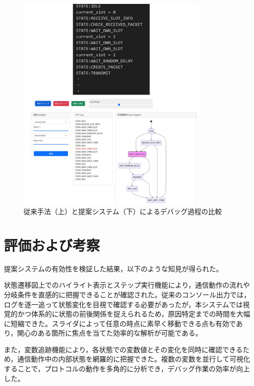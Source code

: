 \documentclass[technicalreport]{ieicej}
\begin{document}
\begin{figure}[h]
  \centering
  \includegraphics[width=95mm]{./images/3_debug_comparison.pdf}
  \caption{従来手法（上）と提案システム（下）によるデバッグ過程の比較}
  \label{fig:debug-comparison}
\end{figure}




\section{評価および考察}
提案システムの有効性を検証した結果，以下のような知見が得られた。

状態遷移図上でのハイライト表示とステップ実行機能により，通信動作の流れや分岐条件を直感的に把握できることが確認された。従来のコンソール出力では，ログを逐一追って状態変化を目視で確認する必要があったが，本システムでは視覚的かつ体系的に状態の前後関係を捉えられるため，原因特定までの時間を大幅に短縮できた。スライダによって任意の時点に素早く移動できる点も有効であり，関心のある箇所に焦点を当てた効率的な解析が可能である。

また，変数追跡機能により，各状態での変数値とその変化を同時に確認できるため，通信動作中の内部状態を網羅的に把握できた。複数の変数を並行して可視化することで，プロトコルの動作を多角的に分析でき，デバッグ作業の効率が向上した。
\end{document}
